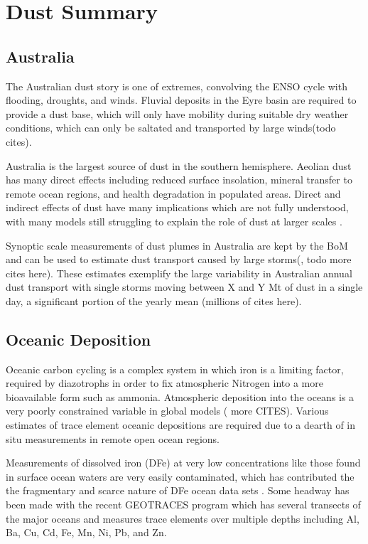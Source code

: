 \section{Dust Summary}

\subsection{Australia}

The Australian dust story is one of extremes, convolving the ENSO cycle with flooding, droughts, and winds.
Fluvial deposits in the Eyre basin are required to provide a dust base, which will only have mobility during suitable dry weather conditions, which can only be saltated and transported by large winds(todo cites).

Australia is the largest source of dust in the southern hemisphere. 
Aeolian dust has many direct effects including reduced surface insolation, mineral transfer to remote ocean regions, and health degradation in populated areas.
Direct and indirect effects of dust have many implications which are not fully understood, with many models still struggling to explain the role of dust at larger scales \cite{Rotstayn_2011}.

Synoptic scale measurements of dust plumes in Australia are kept by the BoM and can be used to estimate dust transport caused by large storms(\cite{Leys_2011}, todo more cites here). 
These estimates exemplify the large variability in Australian annual dust transport with single storms moving between X and Y Mt of dust in a single day, a significant portion of the yearly mean (millions of cites here).

\subsection{Oceanic Deposition}
Oceanic carbon cycling is a complex system in which iron is a limiting factor, required by diazotrophs in order to fix atmospheric Nitrogen into a more bioavailable form such as ammonia. 
Atmospheric deposition into the oceans is a very poorly constrained variable in global models (\cite{Grand_2015} more CITES). 
Various estimates of trace element oceanic depositions are required due to a dearth of in situ measurements in remote open ocean regions.

Measurements of dissolved iron (DFe) at very low concentrations like those found in surface ocean waters are very easily contaminated, which has contributed the the fragmentary and scarce nature of DFe ocean data sets \cite{Rijkenberg_2014}.
Some headway has been made with the recent GEOTRACES program which has several transects of the major oceans and measures trace elements over multiple depths including Al, Ba, Cu, Cd, Fe, Mn, Ni, Pb, and Zn.

